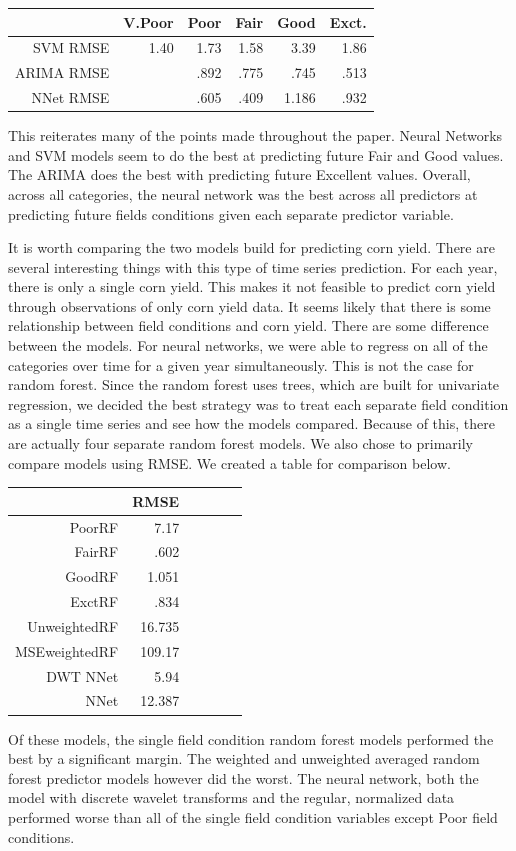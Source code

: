 \documentclass[a4paper]{apa6}
\begin{document}
\begin{center}
\begin{tabular}{|r|r|r|r|r|r|}
\hline
& V.Poor & Poor & Fair & Good & Exct. \\
\hline
SVM RMSE & 1.40 & 1.73 & 1.58 & 3.39 & 1.86 \\
ARIMA RMSE &  & .892 & .775 & .745 & .513 \\
NNet RMSE &  & .605 & .409 & 1.186 & .932 \\
 \hline
\end{tabular}
\end{center}
This reiterates many of the points made throughout the paper. Neural Networks and SVM models seem to do the best at predicting future Fair and Good values. The ARIMA does the best with predicting future Excellent values. Overall, across all categories, the neural network was the best across all predictors at predicting future fields conditions given each separate predictor variable. 
	
It is worth comparing the two models build for predicting corn yield. There are several interesting things with this type of time series prediction. For each year, there is only a single corn yield. This makes it not feasible to predict corn yield through observations of only corn yield data. It seems likely that there is some relationship between field conditions and corn yield. There are some difference between the models. For neural networks, we were able to regress on all of the categories over time for a given year simultaneously. This is not the case for random forest. Since the random forest uses trees, which are built for univariate regression, we decided the best strategy was to treat each separate field condition as a single time series and see how the models compared. Because of this, there are actually four separate random forest models. We also chose to primarily compare models using RMSE. We created a table for comparison below.
	\begin{center}
	\begin{tabular}{|r|r|r|r|r|r|}
	  \hline
	 & RMSE \\
	\hline
	PoorRF & 7.17 \\
	FairRF & .602 \\
	GoodRF & 1.051 \\
	ExctRF & .834 \\
	UnweightedRF & 16.735 \\
	MSEweightedRF & 109.17 \\
	DWT NNet & 5.94 \\
	NNet & 12.387 \\
	\hline
	\end{tabular}
	\end{center}
Of these models, the single field condition random forest models performed the best by a significant margin. The weighted and unweighted averaged random forest predictor models however did the worst. The neural network, both the model with discrete wavelet transforms and the regular, normalized data performed worse than all of the single field condition variables except Poor field conditions. 
\end{document}
